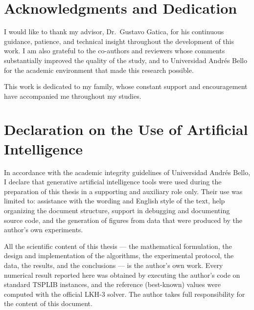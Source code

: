 \documentclass[12pt,a4paper,oneside]{report}
\begin{document}
\chapter*{Acknowledgments and Dedication}

I would like to thank my advisor, Dr.\ Gustavo Gatica, for his continuous
guidance, patience, and technical insight throughout the development of this
work. I am also grateful to the co-authors and reviewers whose comments
substantially improved the quality of the study, and to Universidad Andrés
Bello for the academic environment that made this research possible.

\vspace{0.5cm}
\noindent
This work is dedicated to my family, whose constant support and encouragement
have accompanied me throughout my studies.

\clearpage

\chapter*{Declaration on the Use of Artificial Intelligence}

In accordance with the academic integrity guidelines of Universidad Andrés
Bello, I declare that generative artificial intelligence tools were used during
the preparation of this thesis in a supporting and auxiliary role only. Their
use was limited to: assistance with the wording and English style of the text,
help organizing the document structure, support in debugging and documenting
source code, and the generation of figures from data that were produced by the
author's own experiments.

All the scientific content of this thesis --- the mathematical formulation, the
design and implementation of the algorithms, the experimental protocol, the
data, the results, and the conclusions --- is the author's own work. Every
numerical result reported here was obtained by executing the author's code on
standard TSPLIB instances, and the reference (best-known) values were computed
with the official LKH-3 solver. The author takes full responsibility for the
content of this document.

\clearpage
\end{document}
